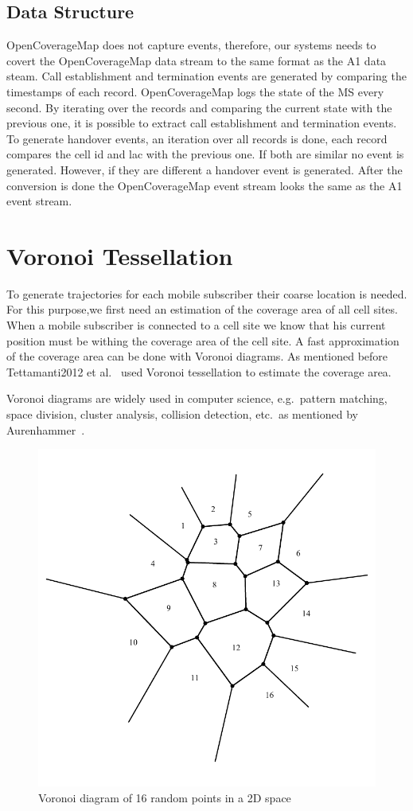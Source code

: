 \subsection{Data Structure}
OpenCoverageMap does not capture events, therefore, our systems needs to covert the OpenCoverageMap data stream to the same format as the A1 data steam. Call establishment and termination events are generated by comparing the timestamps of each record. OpenCoverageMap logs the state of the MS every second. By iterating over the records and comparing the current state with the previous one, it is possible to extract call establishment and termination events. To generate handover events, an iteration over all records is done, each record compares the cell id and lac with the previous one. If both are similar no event is generated. However, if they are different a handover event is generated. After the conversion is done the OpenCoverageMap event stream looks the same as the A1 event stream.  
\section{Voronoi Tessellation}
\label{sec:voronoites}
To generate trajectories for each mobile subscriber their coarse location is needed.
For this purpose,we first need an estimation of the coverage area of all cell sites. When a mobile subscriber is connected to a cell site we know that his current position must be withing the coverage area of the cell site. A fast approximation of the coverage area can be done with Voronoi diagrams.
As mentioned before Tettamanti2012 et al.\ \cite{Tettamanti2012} used Voronoi tessellation to estimate the coverage area.

Voronoi diagrams are widely used in computer science, e.g.\ pattern matching, space division, cluster analysis, collision detection, etc.\ as mentioned by Aurenhammer~\cite{Aurenhammer1991}. 
\begin{figure}
	\centering
	\includegraphics[width=0.7\linewidth]{./images/voronoi2}
	\caption{Voronoi diagram of 16 random points in a 2D space}
	\label{fig:voronoi2}
\end{figure}
 
